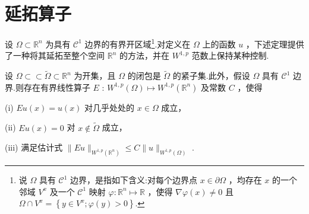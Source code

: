 \section{延拓算子}

设 $\Omega  \subset  {\mathbb{R}}^{n}$ 为具有 ${\mathcal{C}}^{1}$ 边界的有界开区域\footnote{说 $\Omega$ 具有 ${\mathcal{C}}^{1}$ 边界，是指如下含义:对每个边界点 $x \in  \partial \Omega$ ，均存在 $x$ 的一个邻域 ${V}^{x}$ 及一个 ${\mathcal{C}}^{1}$ 映射 $\varphi  : {\mathbb{R}}^{n} \mapsto  \mathbb{R}$ ，使得 $\nabla \varphi \left( x\right)  \neq  0$ 且 $\Omega  \cap  {V}^{x} = \left\{  {y \in  {V}^{x};\varphi \left( y\right)  > 0}\right\}  .$}.对定义在 $\Omega$ 上的函数 $u$ ，下述定理提供了一种将其延拓至整个空间 ${\mathbb{R}}^{n}$ 的方法，并在 ${W}^{1,p}$ 范数上保持某种控制.

\begin{theorem}[延拓算子]\label{thm:extension-operator}
设 $\Omega  \subset   \subset  \widetilde{\Omega } \subset  {\mathbb{R}}^{n}$ 为开集，且 $\Omega$ 的闭包是 $\widetilde{\Omega }$ 的紧子集.此外，假设 $\Omega$ 具有 ${\mathcal{C}}^{1}$ 边界.则存在有界线性算子 $E$ : ${W}^{1,p}\left( \Omega \right)  \mapsto  {W}^{1,p}\left( {\mathbb{R}}^{n}\right)$ 及常数 $C$ ，使得

(i) ${Eu}\left( x\right)  = u\left( x\right)$ 对几乎处处的 $x \in  \Omega$ 成立，

(ii) $Eu\left( x\right)  = 0$ 对 $x \notin  \widetilde{\Omega }$ 成立，

(iii) 满足估计式 $\| {Eu}{\| }_{{W}^{1,p}\left( {\mathbb{R}}^{n}\right) } \leq  C\| u{\| }_{{W}^{1,p}\left( \Omega \right) }$ .
\end{theorem}

